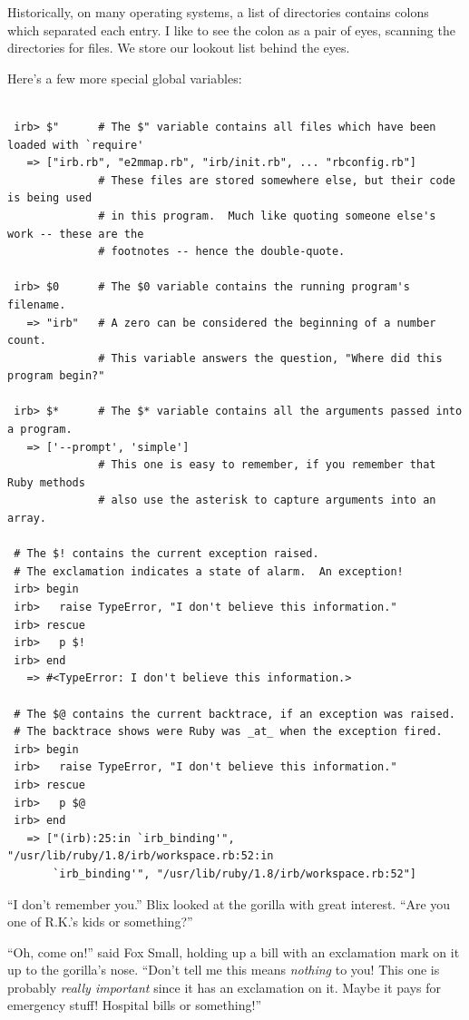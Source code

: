 \documentclass[10pt,twoside]{report}
\begin{document}
Historically, on many operating systems, a list of directories
contains colons which separated each entry.  I like to see the colon
as a pair of eyes, scanning the directories for files.  We store our
lookout list behind the eyes.

Here's a few more special global variables:


\begin{lstlisting}

 irb> $"      # The $" variable contains all files which have been loaded with `require'
   => ["irb.rb", "e2mmap.rb", "irb/init.rb", ... "rbconfig.rb"]
              # These files are stored somewhere else, but their code is being used
              # in this program.  Much like quoting someone else's work -- these are the
              # footnotes -- hence the double-quote.

 irb> $0      # The $0 variable contains the running program's filename.
   => "irb"   # A zero can be considered the beginning of a number count.
              # This variable answers the question, "Where did this program begin?"

 irb> $*      # The $* variable contains all the arguments passed into a program.
   => ['--prompt', 'simple']
              # This one is easy to remember, if you remember that Ruby methods
              # also use the asterisk to capture arguments into an array.

 # The $! contains the current exception raised.
 # The exclamation indicates a state of alarm.  An exception!
 irb> begin
 irb>   raise TypeError, "I don't believe this information."
 irb> rescue
 irb>   p $!
 irb> end
   => #<TypeError: I don't believe this information.>

 # The $@ contains the current backtrace, if an exception was raised.
 # The backtrace shows were Ruby was _at_ when the exception fired.
 irb> begin
 irb>   raise TypeError, "I don't believe this information."
 irb> rescue
 irb>   p $@
 irb> end
   => ["(irb):25:in `irb_binding'", "/usr/lib/ruby/1.8/irb/workspace.rb:52:in
       `irb_binding'", "/usr/lib/ruby/1.8/irb/workspace.rb:52"]

\end{lstlisting}


``I don't remember you.''  Blix looked at the gorilla with great
interest. ``Are you one of R.K.'s kids or something?''

``Oh, come on!'' said Fox Small, holding up a bill with an exclamation
mark on it up to the gorilla's nose. ``Don't tell me this means {\em
  nothing} to you!  This one is probably {\em really important} since
it has an exclamation on it.  Maybe it pays for emergency stuff!
Hospital bills or something!''
\end{document}
